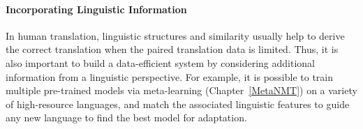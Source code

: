 \paragraph{Incorporating Linguistic Information}
In  human translation, linguistic structures and similarity usually help to derive the correct translation when the paired translation data is limited. Thus, it is also important to build a data-efficient system by considering additional information from  a linguistic perspective. For example, it is possible to train multiple pre-trained models via meta-learning (Chapter~\ref{MetaNMT}) on a variety of high-resource languages, and match the associated linguistic features to guide any new language to find the best model for adaptation.


